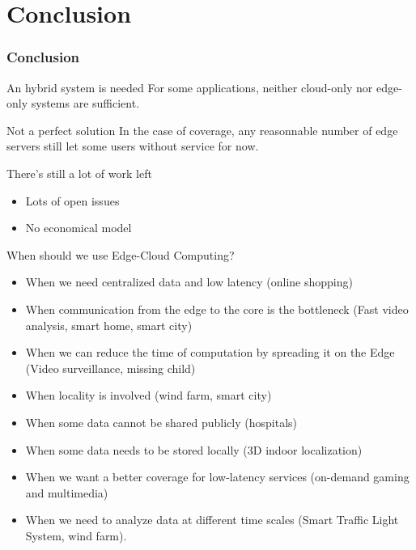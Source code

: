 \documentclass[utf8,xcolor=table, page number]{earlywinter}
\begin{document}
\section{Conclusion}

\begin{frame}
  \frametitle{Conclusion}

  \begin{block}{An hybrid system is needed}
    For some applications, neither cloud-only nor edge-only systems are sufficient.
  \end{block}
  
  \begin{alertblock}{Not a perfect solution}
    In the case of coverage, any reasonnable number of edge servers still let some users without service for now.
  \end{alertblock}
  
  \begin{alertblock}{There's still a lot of work left}
    \begin{itemize}
      \item Lots of open issues
      \item No economical model
    \end{itemize}
  \end{alertblock}

  
\end{frame}


\begin{frame}{When should we use Edge-Cloud Computing?}
\begin{itemize}
\item When we need centralized data and low latency (online shopping)
\item When communication from the edge to the core is the bottleneck (Fast video analysis, smart home, smart city)
\item When we can reduce the time of computation by spreading it on the Edge (Video surveillance, missing child)
\item When locality is involved (wind farm, smart city)
\item When some data cannot be shared publicly (hospitals)
\item When some data needs to be stored locally (3D indoor localization)
\item When we want a better coverage for low-latency services (on-demand gaming and multimedia)
\item When we need to analyze data at different time scales (Smart Traffic Light System, wind farm). 
\end{itemize}
\end{frame}
\end{document}
